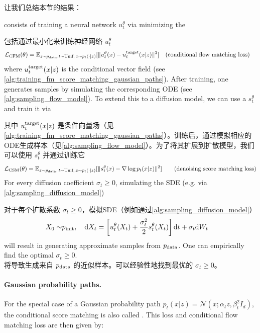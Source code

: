 让我们总结本节的结果：
\begin{summarybox}
 consists of training a neural network $u_t^\theta$ via minimizing the 

包括通过最小化来训练神经网络 $u_t^\theta$
\begin{align}
\mathcal{L}_{\text{CFM}}(\theta) =     \mathbb{E}_{z\sim p_{\rm{data}}, t\sim \text{Unif},\,x\sim p_t(\cdot|z)}[\|u_t^\theta(x) - u^{\text{target}}_t(x|z)\|^2]\quad &(\text{conditional flow matching loss})
\end{align}
where $u^{\text{target}}_t(x|z)$ is the conditional vector field (see \cref{alg:training_fm_score_matching_gaussian_paths}). After training, one generates samples by simulating the corresponding ODE (see \cref{alg:sampling_flow_model}). To extend this to a diffusion model, we can use a  $s_t^\theta$ and train it via 

其中 $u^{\text{target}}_t(x|z)$ 是条件向量场（见\cref{alg:training_fm_score_matching_gaussian_paths}）。训练后，通过模拟相应的ODE生成样本（见\cref{alg:sampling_flow_model}）。为了将其扩展到扩散模型，我们可以使用 $s_t^\theta$ 并通过训练它
\begin{align}
    \label{eq:dsm}
    \mathcal{L}_{\text{CSM}}(\theta) &= \mathbb{E}_{z\sim p_{\rm{data}}, \,t\sim \text{Unif},\,x\sim p_t(\cdot|z)}[\|s_t^\theta(x) - \nabla\log p_t(x|z)\|^2] \quad &(\text{denoising score matching loss})
\end{align}
For every diffusion coefficient $\sigma_t\geq 0$, simulating the SDE (e.g. via \cref{alg:sampling_diffusion_model})

对于每个扩散系数 $\sigma_t\geq 0$，模拟SDE（例如通过\cref{alg:sampling_diffusion_model}）
\begin{align}
\label{eq:sde_sampling_restated_again}
    X_0\sim&p_{\rm{init}},\quad \mathrm{d} X_t =\left[u_t^\theta(X_t)+\frac{\sigma_t^2}{2}s_t^\theta(X_t)\right]\mathrm{d} t +\sigma_t\mathrm{d} W_t
\end{align}
will result in generating approximate samples from $p_{\rm{data}}$. One can empirically find the optimal $\sigma_t\geq 0$.\\

将导致生成来自 $p_{\rm{data}}$ 的近似样本。可以经验性地找到最优的 $\sigma_t\geq 0$。\\

\paragraph{Gaussian probability paths.} For the special case of a Gaussian probability path $p_t(x|z)=\mathcal{N}(x;\alpha_tz,\beta_t^2I_d)$, the conditional score matching is also called . This loss and conditional flow matching loss are then given by:


\end{summarybox}
